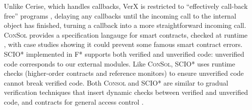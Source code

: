    Unlike Cerise, which handles callbacks, VerX
is restricted to ``effectively call-back free'' programs
\cite{Grossman,relaxed-callbacks-ToDES},
delaying any callbacks until the
incoming call to the internal object has finished,
turning a callback
into a more straightforward  incoming call. 
%
\textsc{ConSol} \cite{consolidating-pldi2024}
provides a specification langauge for smart contracts,
checked at runtime \cite{FinFel01},  with case studies 
showing it could prevent some famous smart contract errors.
SCIO* \cite{secure-io-fstar-popl2024} implemented in
F*
supports both
verified and unverified code: unverified code 
corresponds to our external modules. 
Like \textsc{ConSol}, SCIO* uses runtime checks
(higher-order contracts and reference monitors)
to ensure unverified
code cannot break verified code.
Both \textsc{Consol} and SCIO* are 
similar to gradual verification techniques 
\cite{gradual-verification-popl2024,Cok2022} that
insert dynamic checks between verified and unverified code,
and contracts for general access control 
\cite{DPCC14,AuthContract,cedar-oopsla2024}.


 

 

































